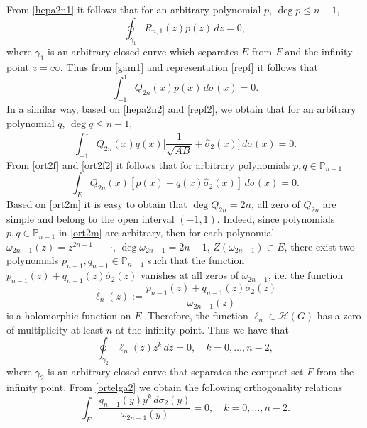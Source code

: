 \documentclass[11pt, a4paper, twoside]{article}
\let\leq\leqslant
\let\myh\widehat
\def\PP{\mathbb P}
\def\HH{\mathscr H}
\def\mdeg{\operatorname{deg}}
\theoremstyle{plain}
\theoremstyle{definition}
\begin{document}
From \eqref{hepa2n1} it follows that for an arbitrary polynomial $p$, $\mdeg{p}\leq{n-1}$,
\begin{equation}
\oint_{\gamma_1}R_{n,1}(z)p(z)\,dz=0,
\label{gam1}
\end{equation}
where $\gamma_1$ is an arbitrary closed  curve which separates $E$ from $F$ and the infinity point $z=\infty$.
Thus from \eqref{gam1} and representation \eqref{repf} it follows that
\begin{equation}
\int_{-1}^1 Q_{2n}(x)p(x)\,d\sigma(x)=0.
\label{ort2f}
\end{equation}
In a similar way, based on \eqref{hepa2n2} and \eqref{repf2}, we obtain that for an arbitrary polynomial $q$, $\mdeg{q}\leq{n-1}$,
\begin{equation}
\int_{-1}^1 Q_{2n} (x)q(x)\biggl[\frac1{\sqrt{AB}}+\myh{\sigma}_2(x)\biggr]\,d\sigma(x)=0.
\label{ort2f2}
\end{equation}
From \eqref{ort2f} and \eqref{ort2f2} it follows that for arbitrary polynomials $p,q\in\PP_{n-1}$
\begin{equation}
\int_E Q_{2n}(x)[p(x)+q(x)\myh{\sigma}_2(x)]\,
d\sigma(x)=0.
\label{ort2m}
\end{equation}
Based on \eqref{ort2m} it is easy to obtain that $\mdeg{Q_{2n}}=2n$, all zero of $Q_{2n}$ are simple and belong to the open interval $(-1,1)$. Indeed, since polynomials $p,q\in\PP_{n-1}$ in \eqref{ort2m} are arbitrary, then for each polynomial $\omega_{2n-1}(z)=z^{2n-1}+\dotsb$,   $\mdeg{\omega_{2n-1}}=2n-1$, $Z(\omega_{2n-1})\subset E$, there exist two polynomials $p_{n-1},q_{n-1}\in\PP_{n-1}$ such that the function $p_{n-1}(z)+q_{n-1}(z)\myh{\sigma}_2(z)$ vanishes at all zeros of $\omega_{2n-1}$, i.e. the function 
\begin{equation}
\ell_n(z):=\frac{p_{n-1}(z)+q_{n-1}(z)\myh{\sigma}_2(z)}{\omega_{2n-1}(z)}
\label{defnelln}
\end{equation}
is a holomorphic function on $E$. Therefore, the function $\ell_n\in\HH(G)$ has a zero of multiplicity at least $n$ at the infinity point.  Thus we have that
\begin{equation}
\oint_{\gamma_2}\ell_n(z)z^k\,dz=0,
\quad k=0,\dots,n-2,
\label{ortelga2}
\end{equation}
where $\gamma_2$ is an arbitrary closed curve that separates the compact set $F$ from the infinity point.  From \eqref{ortelga2} we obtain the following orthogonality relations
\begin{equation}
\int_F \frac{q_{n-1}(y)y^k\,d\sigma_2(y)}{\omega_{2n-1}(y)}=0,
\quad k=0,\dots,n-2.
\label{ortqom}
\end{equation}
\end{document}
